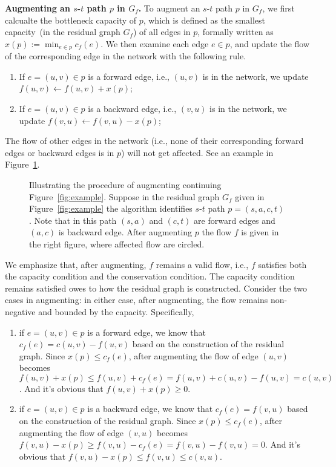{\bf Augmenting an $s$-$t$ path $p$ in $G_f$.}
To augment an $s$-$t$ path $p$ in $G_f$, we first calcualte the bottleneck capacity of
$p$, which is defined as the smallest capacity~(in the residual graph $G_f$) of all edges in $p$, formally
written as $x(p) := \min_{e\in p} c_f(e)$. We then examine each edge $e \in p$, and
update the flow of the corresponding edge in the network with the following rule.

\vspace*{-\topsep}
\begin{enumerate}
\item If $e = (u,v) \in p$ is a forward edge, i.e., $(u,v)$ is in the network, we update $f(u,v) \leftarrow f(u,v)+x(p)$;
\item If $e = (u,v) \in p$ is a backward edge, i.e., $(v,u)$ is in the network, we update $f(v,u) \leftarrow f(v,u)-x(p)$;
\end{enumerate}

The flow of other edges in the network (i.e., none of their corresponding
forward edges or backward edges is in $p$) will not get affected. See an
example in Figure~\ref{fig:augment}.

\begin{figure}[h]
\centering{}
\caption{Illustrating the procedure of augmenting continuing Figure~\ref{fig:example}. Suppose
in the residual graph $G_f$ given in Figure~\ref{fig:example} the algorithm identifies $s$-$t$
path $p = (s,a,c,t)$. Note that in this path $(s,a)$ and $(c,t)$ are forward
edges and $(a, c)$ is backward edge. After augmenting $p$ the flow $f$ is given in the right figure,
where affected flow are circled.}
\label{fig:augment}
\end{figure}

We emphasize that, after augmenting, $f$ remains a valid flow, i.e., $f$ satisfies
both the capacity condition and the conservation condition. The capacity
condition remains satisfied owes to how the residual graph is constructed.
Consider the two cases in augmenting: in either case, after augmenting, the
flow remains non-negative and bounded by the capacity. Specifically,

\vspace*{-\topsep}
\begin{enumerate}
\item if $e=(u,v)\in p$ is a forward edge, we know that $c_f(e)=c(u,v)-f(u,v)$ based on the
construction of the residual graph. Since $x( p) \le c_f (e)$, after augmenting the
flow of edge $(u, v)$ becomes $f(u, v) + x(p) \le f(u,v)+c_f (e) = f(u,v)+c(u,v)- f(u,v) = c(u,v)$. 
And it’s obvious that $f(u,v)+x(p) \ge 0$.
\item if $e=(u,v)\in p$ is a backward edge, we know that $c_f(e)=f(v,u)$ based on the
construction of the residual graph. Since $x(p) \le c_f(e)$, after augmenting the
flow of edge $(v, u)$ becomes $f(v, u) - x(p) \ge f(v,u)-c_f (e) = f(v,u)-f(v,u) = 0$. 
And it’s obvious that $f(v,u)-x(p) \le f(v,u) \le c(v,u)$.
\end{enumerate}

